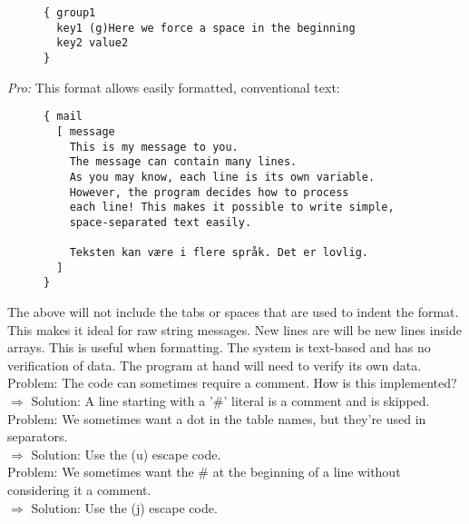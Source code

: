 \documentclass[listof=totoc]{article}
\begin{document}
\begin{figure}[H]
\centering
\begin{varwidth}{\linewidth}
\begin{verbatim}
{ group1
  key1 (g)Here we force a space in the beginning
  key2 value2
}
\end{verbatim}
\end{varwidth}
\caption{}
\end{figure}

\textit{Pro:} This format allows easily formatted, conventional text:

\begin{figure}[H]
\centering
\begin{varwidth}{\linewidth}
\begin{verbatim}
{ mail
  [ message
    This is my message to you.
    The message can contain many lines.
    As you may know, each line is its own variable.
    However, the program decides how to process
    each line! This makes it possible to write simple,
    space-separated text easily.

    Teksten kan være i flere språk. Det er lovlig.
  ]
}
\end{verbatim}
\end{varwidth}
\caption{}
\end{figure}

\noindent The above will not include the tabs or spaces that are used to indent the format. This makes it ideal for raw string messages. New lines are will be new lines inside arrays. This is useful when formatting. The system is text-based and has no verification of data.
The program at hand will need to verify its own data. \\

\noindent Problem: The code can sometimes require a comment. How is this implemented? \\
\noindent $\Rightarrow$ Solution: A line starting with a '\#' literal is a comment and is skipped. \\

\noindent Problem: We sometimes want a dot in the table names, but they're used in separators. \\
\noindent $\Rightarrow$ Solution: Use the (u) escape code. \\

\noindent Problem: We sometimes want the \# at the beginning of a line without considering it a comment. \\
\noindent $\Rightarrow$ Solution: Use the (j) escape code. \\
\end{document}
